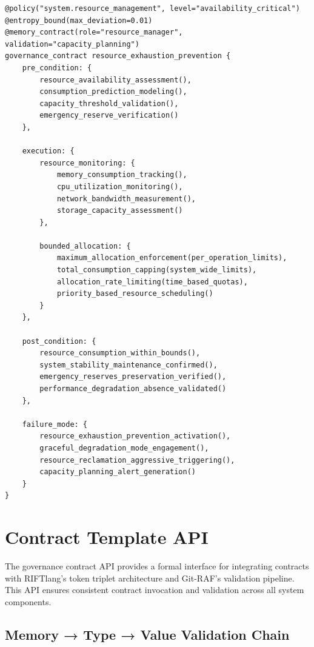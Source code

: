 \documentclass[11pt,letterpaper]{article}
\begin{document}
\begin{lstlisting}[language=rift, caption=Resource Bounds Enforcement Pattern]
@policy("system.resource_management", level="availability_critical")
@entropy_bound(max_deviation=0.01)
@memory_contract(role="resource_manager", validation="capacity_planning")
governance_contract resource_exhaustion_prevention {
    pre_condition: {
        resource_availability_assessment(),
        consumption_prediction_modeling(),
        capacity_threshold_validation(),
        emergency_reserve_verification()
    },
    
    execution: {
        resource_monitoring: {
            memory_consumption_tracking(),
            cpu_utilization_monitoring(),
            network_bandwidth_measurement(),
            storage_capacity_assessment()
        },
        
        bounded_allocation: {
            maximum_allocation_enforcement(per_operation_limits),
            total_consumption_capping(system_wide_limits),
            allocation_rate_limiting(time_based_quotas),
            priority_based_resource_scheduling()
        }
    },
    
    post_condition: {
        resource_consumption_within_bounds(),
        system_stability_maintenance_confirmed(),
        emergency_reserves_preservation_verified(),
        performance_degradation_absence_validated()
    },
    
    failure_mode: {
        resource_exhaustion_prevention_activation(),
        graceful_degradation_mode_engagement(),
        resource_reclamation_aggressive_triggering(),
        capacity_planning_alert_generation()
    }
}
\end{lstlisting}

\section{Contract Template API}

The governance contract API provides a formal interface for integrating contracts with RIFTlang's token triplet architecture and Git-RAF's validation pipeline. This API ensures consistent contract invocation and validation across all system components.

\subsection{Memory → Type → Value Validation Chain}
\end{document}
